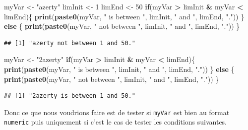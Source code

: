 \documentclass[]{book}
\newenvironment{Shaded}{\begin{snugshade}}{\end{snugshade}}
\newcommand{\ControlFlowTok}[1]{\textcolor[rgb]{0.13,0.29,0.53}{\textbf{#1}}}
\newcommand{\DecValTok}[1]{\textcolor[rgb]{0.00,0.00,0.81}{#1}}
\newcommand{\KeywordTok}[1]{\textcolor[rgb]{0.13,0.29,0.53}{\textbf{#1}}}
\newcommand{\NormalTok}[1]{#1}
\newcommand{\OperatorTok}[1]{\textcolor[rgb]{0.81,0.36,0.00}{\textbf{#1}}}
\newcommand{\StringTok}[1]{\textcolor[rgb]{0.31,0.60,0.02}{#1}}
\begin{document}
\begin{Shaded}
\begin{Highlighting}[]
\NormalTok{myVar <-}\StringTok{ "azerty"}
\NormalTok{limInit <-}\StringTok{ }\DecValTok{1}
\NormalTok{limEnd <-}\StringTok{ }\DecValTok{50}
\ControlFlowTok{if}\NormalTok{(myVar }\OperatorTok{>}\StringTok{ }\NormalTok{limInit }\OperatorTok{&}\StringTok{ }\NormalTok{myVar }\OperatorTok{<}\StringTok{ }\NormalTok{limEnd)\{}
  \KeywordTok{print}\NormalTok{(}\KeywordTok{paste0}\NormalTok{(myVar, }\StringTok{" is between "}\NormalTok{, limInit, }\StringTok{" and "}\NormalTok{, limEnd, }\StringTok{"."}\NormalTok{))}
\NormalTok{\} }\ControlFlowTok{else}\NormalTok{ \{}
  \KeywordTok{print}\NormalTok{(}\KeywordTok{paste0}\NormalTok{(myVar, }\StringTok{" not between "}\NormalTok{, limInit, }\StringTok{" and "}\NormalTok{, limEnd, }\StringTok{"."}\NormalTok{))}
\NormalTok{\}}
\end{Highlighting}
\end{Shaded}

\begin{verbatim}
## [1] "azerty not between 1 and 50."
\end{verbatim}

\begin{Shaded}
\begin{Highlighting}[]
\NormalTok{myVar <-}\StringTok{ "2azerty"}
\ControlFlowTok{if}\NormalTok{(myVar }\OperatorTok{>}\StringTok{ }\NormalTok{limInit }\OperatorTok{&}\StringTok{ }\NormalTok{myVar }\OperatorTok{<}\StringTok{ }\NormalTok{limEnd)\{}
  \KeywordTok{print}\NormalTok{(}\KeywordTok{paste0}\NormalTok{(myVar, }\StringTok{" is between "}\NormalTok{, limInit, }\StringTok{" and "}\NormalTok{, limEnd, }\StringTok{"."}\NormalTok{))}
\NormalTok{\} }\ControlFlowTok{else}\NormalTok{ \{}
  \KeywordTok{print}\NormalTok{(}\KeywordTok{paste0}\NormalTok{(myVar, }\StringTok{" not between "}\NormalTok{, limInit, }\StringTok{" and "}\NormalTok{, limEnd, }\StringTok{"."}\NormalTok{))}
\NormalTok{\}}
\end{Highlighting}
\end{Shaded}

\begin{verbatim}
## [1] "2azerty is between 1 and 50."
\end{verbatim}

Donc ce que nous voudrions faire est de tester si \texttt{myVar} est bien au format \texttt{numeric} puis uniquement si c'est le cas de tester les conditions suivantes.
\end{document}
